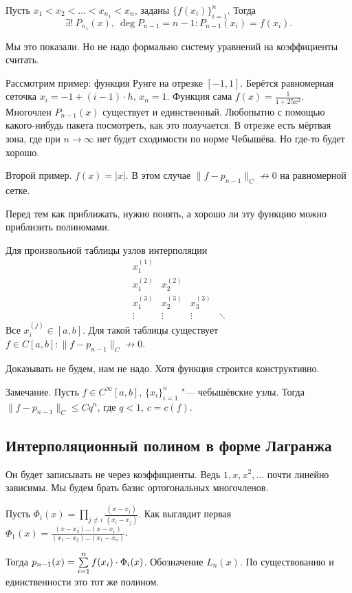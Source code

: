 \begin{Lem}
  Пусть $x_1<x_2<\dots<x_{n_1}<x_n$, заданы $\big\{f(x_i)\big\}_{i=1}^n$. Тогда 
\[
  \exists!\ P_{n_1}(x),\ \deg P_{n-1}=n-1\colon P_{n-1}(x_i)=f(x_i).
\]
\end{Lem}
Мы это показали. Но не надо формально систему уравнений на коэффициенты считать.

Рассмотрим пример: функция Рунге на отрезке $[-1,1]$. Берётся равномерная сеточка $x_i = -1 + (i-1)\cdot h$, $x_n=1$. Функция сама $f(x) = \frac1{1+ 25 x^2}$. Многочлен $P_{n-1}(x)$ существует и единственный. Любопытно с помощью какого-нибудь пакета посмотреть, как это получается.  В отрезке есть мёртвая зона, где при $n\to\infty$ нет будет сходимости по норме Чебышёва. Но где-то будет хорошо.

Второй пример. $f(x) = | x|$. В этом случае $\|f-p_{n-1}\|_C\not\to 0$ на равномерной сетке.

Перед тем как приближать, нужно понять, а хорошо ли эту функцию можно приблизить полиномами.

\begin{The}[Фабера]
  Для произвольной таблицы узлов интерполяции
\[
  \begin{matrix}
 x_1^{(1)}\\
 x_1^{(2)} & x_2^{(2)} \\
 x_1^{(3)} & x_2^{(3)} & x_3^{(3)} \\
 \vdots & \vdots & \vdots & \ddots
\end{matrix}
\] 
Все $x_i^{(j)}\in[a,b]$. Для такой таблицы существует $f\in C[a,b]\colon \|f-p_{n-1}\|_C\not\to 0$.
\end{The}
Доказывать не будем, нам не надо. Хотя функция строится конструктивно.

Замечание. Пусть $f\in C^\infty[a,b]$, $\{x_i\}_{i=1}^n$ "--- чебышёвские узлы. Тогда $\|f - p_{n-1}\|_C\le C q^n$, где $q<1$, $c = c(f)$.

\subsection{Интерполяционный полином в форме Лагранжа}
Он будет записывать не через коэффициенты. Ведь $1,x,x^2,\dots$ почти линейно зависимы. Мы будем брать базис ортогональных многочленов.

Пусть $\Phi_i(x) = \prod\limits_{j\ne i}\frac{(x-x_j)}{(x_i-x_j)}$. Как выглядит первая $\Phi_1(x) = \frac{(x - x_2)\dots (x-x_1)}{(x_1-x_2)\dots(x_1-x_n)}$.

Тогда $p_{n-1}(x) = \sum\limits_{i = 1}^{n} f(x_i)\cdot \Phi_i(x)$. Обозначение $L_n(x)$. По существованию и единственности это тот же полином.

